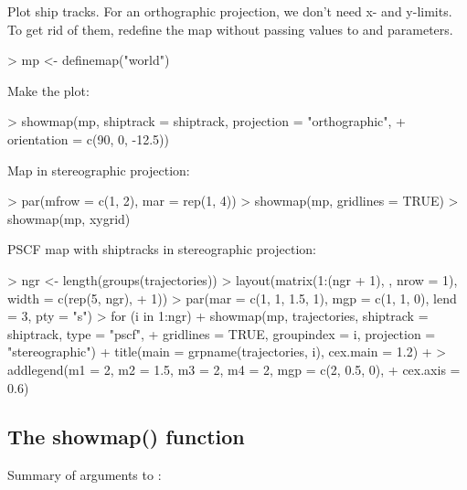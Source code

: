 \documentclass{article}
\renewenvironment{Schunk}{\vspace{\topsep}}{\vspace{\topsep}}
\begin{document}
Plot ship tracks. For an orthographic projection, we don't need x- and
y-limits. To get rid of them, redefine the map without passing values
to \verb@xlim@ and \verb@ylim@ parameters.

\begin{Schunk}
\begin{Sinput}
> mp <- definemap("world")
\end{Sinput}
\end{Schunk}

Make the plot:

\begin{Schunk}
\begin{Sinput}
> showmap(mp, shiptrack = shiptrack, projection = "orthographic", 
+     orientation = c(90, 0, -12.5))
\end{Sinput}
\end{Schunk}

Map in stereographic projection:

\begin{Schunk}
\begin{Sinput}
> par(mfrow = c(1, 2), mar = rep(1, 4))
> showmap(mp, gridlines = TRUE)
> showmap(mp, xygrid)
\end{Sinput}
\end{Schunk}

PSCF map with shiptracks in stereographic projection:

\begin{Schunk}
\begin{Sinput}
> ngr <- length(groups(trajectories))
> layout(matrix(1:(ngr + 1), , nrow = 1), width = c(rep(5, ngr), 
+     1))
> par(mar = c(1, 1, 1.5, 1), mgp = c(1, 1, 0), lend = 3, pty = "s")
> for (i in 1:ngr) {
+     showmap(mp, trajectories, shiptrack = shiptrack, type = "pscf", 
+         gridlines = TRUE, groupindex = i, projection = "stereographic")
+     title(main = grpname(trajectories, i), cex.main = 1.2)
+ }
> addlegend(m1 = 2, m2 = 1.5, m3 = 2, m4 = 2, mgp = c(2, 0.5, 0), 
+     cex.axis = 0.6)
\end{Sinput}
\end{Schunk}

\subsection{The showmap() function}


Summary of arguments to \verb@showmap@:
\end{document}
